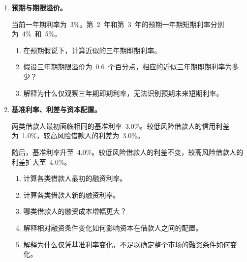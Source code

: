 \begin{enumerate}
\begin{enumerate}
\item 解释为什么远期利率未必等于预期未来一年期短期利率。

\end{enumerate}

\item \textbf{预期与期限溢价。}

当前一年期利率为~3\%。第~2~年和第~3~年的预期一年期短期利率分别为~4\%~和~5\%。

\begin{enumerate}

\item 在预期假说下，计算近似的三年期即期利率。

\item 假设三年期期限溢价为~0.6~个百分点，相应的近似三年期即期利率为多少？

\item 解释为什么仅观察三年期即期利率，无法识别预期未来短期利率。

\end{enumerate}

\item \textbf{基准利率、利差与资本配置。}

两类借款人最初面临相同的基准利率~3.0\%。较低风险借款人的信用利差为~1.0\%，较高风险借款人的利差为~3.0\%。

随后，基准利率升至~4.0\%。较低风险借款人的利差不变，较高风险借款人的利差扩大至~4.0\%。

\begin{enumerate}

\item 计算各类借款人最初的融资利率。

\item 计算各类借款人新的融资利率。

\item 哪类借款人的融资成本增幅更大？

\item 解释相对融资条件变化如何影响资本在借款人之间的配置。

\item 解释为什么仅凭基准利率变化，不足以确定整个市场的融资条件如何变化。

\end{enumerate}

\end{enumerate}


